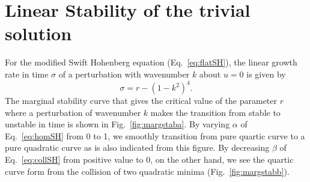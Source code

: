 \documentclass[../main/FlatMarginalStability.tex]{subfiles}
\begin{document}
\section{Linear Stability of the trivial solution}

For the modified Swift Hohenberg equation (Eq.~\ref{eq:flatSH}), the linear growth rate in time $\sigma$ of a perturbation with wavenumber $k$ about $u=0$ is given by
\begin{equation}
\sigma= r -\left(1-k^2\right)^4.
\end{equation}
The marginal stability curve that gives the critical value of the parameter $r$ where a perturbation of wavenumber $k$ makes the transition from stable to unstable in time is shown in Fig.~\ref{fig:margstaba}.  By varying $\alpha$ of Eq.~\ref{eq:homSH} from 0 to 1, we smoothly transition from pure quartic curve to a pure quadratic curve as is also indicated from this figure.  
\FIGmargstaba
\FIGmargstabb
By decreasing $\beta$ of Eq.~\ref{eq:collSH} from positive value to 0, on the other hand, we see the quartic curve form from the collision of two quadratic minima (Fig.~\ref{fig:margstabb}).
\end{document}

